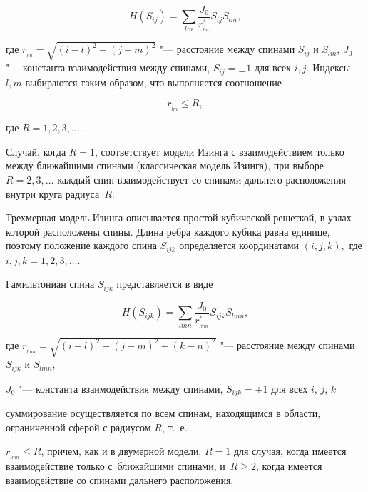\begin{equation}

H(S_{ij}) =  \sum_{lm}{\frac{J_{0}}{{r^{^3}_{_{lm}}} } S_{ij} S_{lm}} ,

\label{bir:eq1}


\end{equation}

где $r_{_{lm}}=\sqrt{(i-l)^2+(j-m)^2}

$ "--- расстояние между спинами $S_{ij}$ и $S_{lm}$, $J_0$ "--- константа взаимодействия между спинами, $S_{ij} = \pm1$ для всех $i, j$. Индексы $l, m$ выбираются таким образом, что выполняется соотношение

$$

r_{_{lm}} \leq R,

$$

где $R = 1, 2, 3, \dots$. 

Случай, когда $R = 1$, соответствует модели Изинга с взаимодействием только между ближайшими спинами (классическая модель Изинга), при выборе $R = 2, 3, \dots$ каждый спин взаимодействует со спинами дальнего расположения внутри круга радиуса~$R$.



Трехмерная модель Изинга описывается простой кубической решеткой, в узлах которой расположены спины. Длина ребра каждого кубика равна единице, поэтому положение каждого спина  $S_{ijk}$ определяется координатами $(i, j, k),$ где $i, j, k = 1, 2, 3, \dots$. 

Гамильтониан спина $S_{ijk}$ представляется в виде

\begin{equation}

H(S_{ijk}) =  \sum_{lmn}{\frac{J_{0}}{{r^{^4}_{_{lmn}}} } S_{ijk} S_{lmn}} ,

\label{bir:eq3}

\end{equation}

где $r_{_{lmn}}=\sqrt{(i-l)^2+(j-m)^2+(k-n)^2}$ "--- расстояние между спинами $S_{ijk}$ и $S_{lmn}$,

$J_0$ "--- константа взаимодействия между спинами, $S_{ijk} = \pm1$ для всех $i$, $j$, $k$

суммирование осуществляется по всем спинам, находящимся в области, ограниченной сферой с радиусом $R$, т.~е.

$r_{_{lmn}} \leq R$, причем, как и в двумерной модели, $R = 1$ для случая, когда имеется  взаимодействие только с~ближайшими спинами, и~$R \geq 2$, когда имеется взаимодействие со спинами дальнего расположения.



